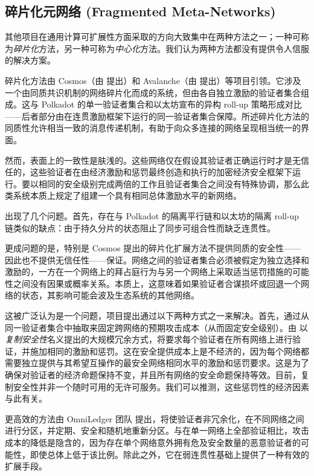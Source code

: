 \subsection{碎片化元网络 (Fragmented Meta-Networks)}

其他项目在通用计算可扩展性方面采取的方向大致集中在两种方法之一；一种可称为\emph{碎片化}方法，另一种可称为\emph{中心化}方法。我们认为两种方法都没有提供令人信服的解决方案。

碎片化方法由 Cosmos（由 \cite{kwon2019cosmos} 提出）和 Avalanche（由 \cite{tanana2019avalanche} 提出）等项目引领。它涉及一个由同质共识机制的网络碎片化而成的系统，但由各自独立激励的验证者集合组成。这与 Polkadot 的单一验证者集合和以太坊宣布的异构 roll-up 策略形成对比——后者部分由在连贯激励框架下运行的同一验证者集合保障。所述碎片化方法的同质性允许相当一致的消息传递机制，有助于向众多连接的网络呈现相当统一的界面。

然而，表面上的一致性是肤浅的。这些网络仅在假设其验证者正确运行时才是无信任的，这些验证者在由经济激励和惩罚最终创造和执行的加密经济安全框架下运行。要以相同的安全级别完成两倍的工作且验证者集合之间没有特殊协调，那么此类系统本质上规定了组建一个具有相同总体激励水平的新网络。

出现了几个问题。首先，存在与 Polkadot 的隔离平行链和以太坊的隔离 roll-up 链类似的缺点：由于持久分片的状态阻止了同步可组合性而缺乏连贯性。

更成问题的是，特别是 Cosmos 提出的碎片化扩展方法不提供同质的安全性——因此也不提供无信任性——保证。网络之间的验证者集合必须被假定为独立选择和激励的，一方在一个网络上的拜占庭行为与另一个网络上采取适当惩罚措施的可能性之间没有因果或概率关系。本质上，这意味着如果验证者合谋损坏或回退一个网络的状态，其影响可能会波及生态系统的其他网络。

这被广泛认为是一个问题，项目提出通过以下两种方式之一来解决。首先，通过从同一验证者集合中抽取来固定跨网络的预期攻击成本（从而固定安全级别）。由 \cite{cosmos2024interchain} 以\emph{复制安全性}名义提出的大规模冗余方式，将要求每个验证者在所有网络上进行验证，并施加相同的激励和惩罚。这在安全提供成本上是不经济的，因为每个网络都需要独立提供与其希望互操作的最安全网络相同水平的激励和惩罚要求。这是为了确保对验证者的经济命题保持不变，并且所有网络的安全命题保持等效。目前，复制安全性并非一个随时可用的无许可服务。我们可以推测，这些惩罚性的经济因素与此有关。

更高效的方法由 OmniLedger 团队 \cite{cryptoeprint:2017/406} 提出，将使验证者非冗余化，在不同网络之间进行分区，并定期、安全和随机地重新分区。与在单一网络上全部验证相比，攻击成本的降低是隐含的，因为存在单个网络意外拥有危及安全数量的恶意验证者的可能性，即使总体上低于该比例。除此之外，它在弱连贯性基础上提供了一种有效的扩展手段。

